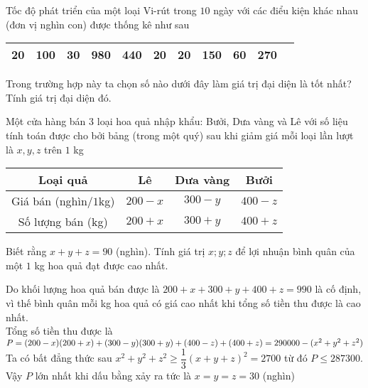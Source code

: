 \begin{bt}%
Tốc độ phát triển của một loại Vi-rút trong  $10$ ngày với các điểu kiện khác nhau (đơn vị nghìn con) được thống kê như sau
\begin{center}
\begin{tabular}{|c|c|c|c|c|c|c|c|c|c|c|}
\hline 
 20 & 100 & 30 & 980 & 440 & 20 & 20 & 150 & 60 & 270 \\ 
\hline 
\end{tabular} 
\end{center}
Trong trường hợp này ta chọn số nào dưới đây làm giá trị đại diện là tốt nhất? Tính giá trị đại diện đó.
\end{bt}
\begin{bt}%
Một cửa hàng bán $3$ loại hoa quả nhập khẩu: Bưởi, Dưa vàng và Lê với số liệu tính toán được cho bởi bảng  (trong một quý) sau khi giảm giá mỗi loại lần lượt là $x,y,z$ trên $1$ kg
\begin{center}
\begin{tabular}{|c|c|c|c|}
\hline
Loại quả & Lê &Dưa vàng&Bưởi \\
\hline
Giá bán (nghìn/$1$kg) & $200-x$&$300-y$&$400-z$ \\
\hline
Số lượng bán (kg)& $200+x$&$300+y$&$400+z$\\
\hline
\end{tabular}
\end{center}
Biết rằng $x+y+z = 90$ (nghìn). Tính giá trị $ x;y;z$ để lợi nhuận bình quân của một $1$ kg hoa quả đạt được cao nhất.
\loigiai
{
Do khối lượng hoa quả bán được là $200+x+300+y+400+z=990$ là cố định, vì thế bình quân mỗi kg hoa quả có giá cao nhất khi tổng số tiền thu được là cao nhất.\\
Tổng số tiền thu được là $P=(200-x)(200+x)+(300-y)(300+y)+(400-z)+(400+z)\\=290000-(x^2+y^2+z^2)$\\
Ta có bất đẳng thức sau $x^2+y^2+z^2\geq \dfrac{1}{3}(x+y+z)^2=2700$ từ đó $P\leq 287300 $. Vậy $P$ lớn nhất khi dấu bằng xảy ra tức là $x=y=z=30$ (nghìn)

}
\end{bt}


